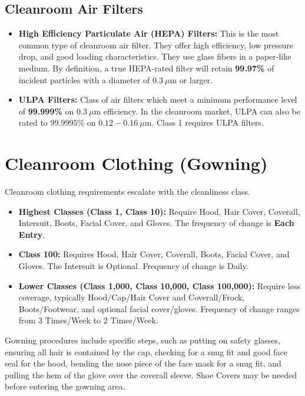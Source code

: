 \documentclass{report}
\begin{document}
\subsection{Cleanroom Air Filters}

\begin{itemize}
    \item \textbf{High Efficiency Particulate Air (HEPA) Filters:} This is the most common type of cleanroom air filter. They offer high efficiency, low pressure drop, and good loading characteristics. They use glass fibers in a paper-like medium. By definition, a true HEPA-rated filter will retain \textbf{99.97\%} of incident particles with a diameter of $0.3~\mu \text{m}$ or larger.
    \item \textbf{ULPA Filters:} Class of air filters which meet a minimum performance level of \textbf{99.999\%} on $0.3~\mu \text{m}$ efficiency. In the cleanroom market, ULPA can also be rated to $99.9995\%$ on $0.12 - 0.16~\mu \text{m}$. Class 1 requires ULPA filters.
\end{itemize}

\section{Cleanroom Clothing (Gowning)}

Cleanroom clothing requirements escalate with the cleanliness class.

\begin{itemize}
    \item \textbf{Highest Classes (Class 1, Class 10):} Require Hood, Hair Cover, Coverall, Intersuit, Boots, Facial Cover, and Gloves. The frequency of change is \textbf{Each Entry}.
    \item \textbf{Class 100:} Requires Hood, Hair Cover, Coverall, Boots, Facial Cover, and Gloves. The Intersuit is Optional. Frequency of change is Daily.
    \item \textbf{Lower Classes (Class 1,000, Class 10,000, Class 100,000):} Require less coverage, typically Hood/Cap/Hair Cover and Coverall/Frock, Boots/Footwear, and optional facial cover/gloves. Frequency of change ranges from 3 Times/Week to 2 Times/Week.
\end{itemize}

Gowning procedures include specific steps, such as putting on safety glasses, ensuring all hair is contained by the cap, checking for a snug fit and good face seal for the hood, bending the nose piece of the face mask for a snug fit, and pulling the hem of the glove over the coverall sleeve. Shoe Covers may be needed before entering the gowning area.
\end{document}
